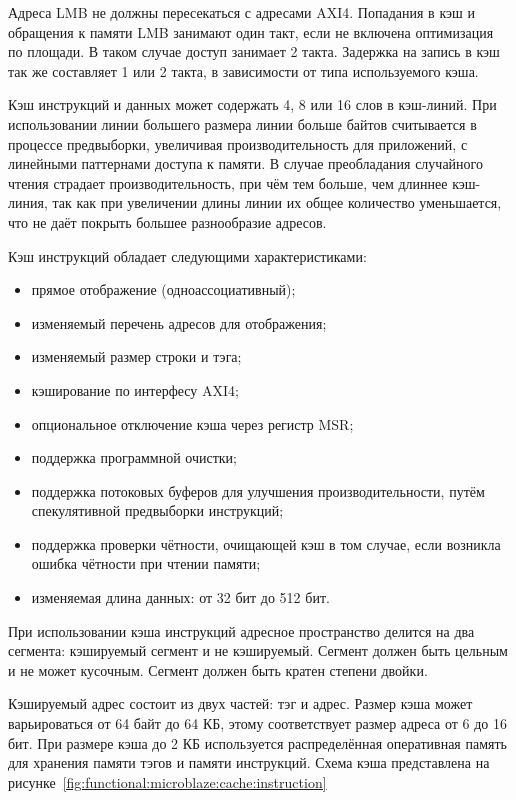 Адреса LMB не должны пересекаться с адресами AXI4.
Попадания в кэш и обращения к памяти LMB занимают один такт, если не включена оптимизация по площади.
В таком случае доступ занимает 2 такта. Задержка на запись в кэш так же составляет 1 или 2 такта,
в зависимости от типа используемого кэша.

Кэш инструкций и данных может содержать 4, 8 или 16 слов в кэш-линий. При использовании линии большего размера
линии больше байтов считывается в процессе предвыборки, увеличивая производительность для приложений, с
линейными паттернами доступа к памяти. В случае преобладания случайного чтения страдает производительность, при чём
тем больше, чем длиннее кэш-линия, так как при увеличении длины линии их общее количество уменьшается, что
не даёт покрыть большее разнообразие адресов.

Кэш инструкций обладает следующими характеристиками:
\begin{itemize}
   \item прямое отображение (одноассоциативный);
   \item изменяемый перечень адресов для отображения;
   \item изменяемый размер строки и тэга;
   \item кэширование по интерфесу AXI4;
   \item опциональное отключение кэша через регистр MSR;
   \item поддержка программной очистки;
   \item поддержка потоковых буферов для улучшения производительности,
     путём спекулятивной предвыборки инструкций;
   \item поддержка проверки чётности, очищающей кэш в том случае, если
     возникла ошибка чётности при чтении памяти;
   \item изменяемая длина данных: от 32 бит до 512 бит.
\end{itemize}

При использовании кэша инструкций адресное пространство делится на два сегмента:
кэшируемый сегмент и не кэшируемый. Сегмент должен быть цельным и не может
кусочным. Сегмент должен быть кратен степени двойки.

Кэшируемый адрес состоит из двух частей: тэг и адрес. Размер кэша может
варьироваться от 64 байт до 64 КБ, этому соответствует размер адреса от
6 до 16 бит. При размере кэша до 2 КБ используется распределённая оперативная
память для хранения памяти тэгов и памяти инструкций. Схема кэша представлена
на рисунке~\ref{fig:functional:microblaze:cache:instruction}


